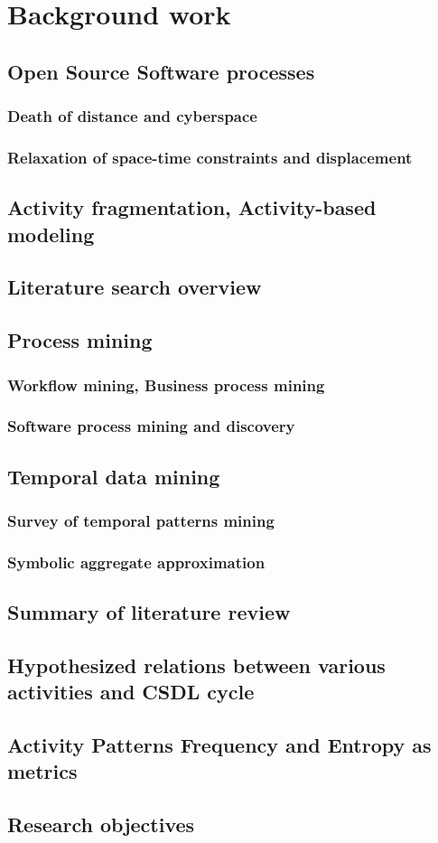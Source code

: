 \chapter{Background work}
\section{Open Source Software processes}
\subsection{Death of distance and cyberspace}
\subsection{Relaxation of space-time constraints and displacement}
\section{Activity fragmentation, Activity-based modeling}
\section{Literature search overview}
\section{Process mining}
\subsection{Workflow mining, Business process mining}
\subsection{Software process mining and discovery}
\section{Temporal data mining}
\subsection{Survey of temporal patterns mining}
\subsection{Symbolic aggregate approximation}
\section{Summary of literature review}
\section{Hypothesized relations between various activities and CSDL cycle}
\section{Activity Patterns Frequency and Entropy as metrics}
\section{Research objectives}